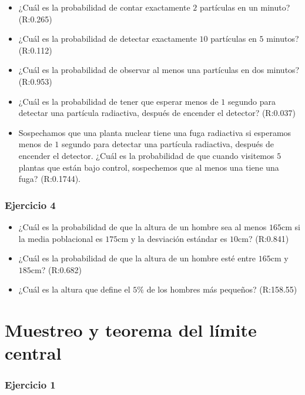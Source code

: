 \documentclass[
]{book}
\begin{document}
\begin{itemize}
\item
  ¿Cuál es la probabilidad de contar exactamente \(2\) partículas en un minuto? (R:0.265)
\item
  ¿Cuál es la probabilidad de detectar exactamente \(10\) partículas en \(5\) minutos? (R:0.112)
\item
  ¿Cuál es la probabilidad de observar al menos una partículas en dos minutos? (R:0.953)
\item
  ¿Cuál es la probabilidad de tener que esperar menos de \(1\) segundo para detectar una partícula radiactiva, después de encender el detector? (R:0.037)
\item
  Sospechamos que una planta nuclear tiene una fuga radiactiva si esperamos menos de \(1\) segundo para detectar una partícula radiactiva, después de encender el detector. ¿Cuál es la probabilidad de que cuando visitemos \(5\) plantas que están bajo control, sospechemos que al menos una tiene una fuga? (R:0.1744).
\end{itemize}

\hypertarget{ejercicio-4-2}{%
\subsubsection{Ejercicio 4}\label{ejercicio-4-2}}

\begin{itemize}
\item
  ¿Cuál es la probabilidad de que la altura de un hombre sea al menos
  \(165\)cm si la media poblacional es \(175\)cm y la desviación estándar es \(10\)cm? (R:0.841)
\item
  ¿Cuál es la probabilidad de que la altura de un hombre esté entre
  \(165\)cm y \(185\)cm? (R:0.682)
\item
  ¿Cuál es la altura que define el \(5\%\) de los hombres más pequeños? (R:158.55)
\end{itemize}

\hypertarget{muestreo-y-teorema-del-luxedmite-central}{%
\section{Muestreo y teorema del límite central}\label{muestreo-y-teorema-del-luxedmite-central}}

\hypertarget{ejercicio-1-5}{%
\subsubsection{Ejercicio 1}\label{ejercicio-1-5}}
\end{document}
